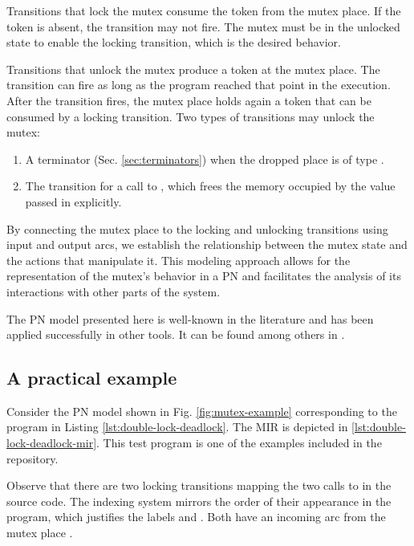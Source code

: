 Transitions that lock the mutex consume the token from the mutex place.
If the token is absent, the transition may not fire.
The mutex must be in the unlocked state to enable the locking transition,
which is the desired behavior.

Transitions that unlock the mutex produce a token at the mutex place.
The transition can fire as long as the program reached that point in the execution.
After the transition fires, the mutex place holds again a token
that can be consumed by a locking transition.
Two types of transitions may unlock the mutex:

\begin{enumerate}
      \item A  terminator (Sec. \ref{sec:terminators})
            when the dropped place is of type .
      \item The transition for a call to ,
            which frees the memory occupied by the value passed in explicitly.
\end{enumerate}

By connecting the mutex place
to the locking and unlocking transitions using input and output arcs,
we establish the relationship between the mutex state and the actions that manipulate it.
This modeling approach allows for the representation of the mutex's behavior in a \acrshort{PN}
and facilitates the analysis of its interactions with other parts of the system.

The \acrshort{PN} model presented here is well-known in the literature
and has been applied successfully in other tools.
It can be found among others in \cite{kavi2002modeling,moshtaghi2001,meyer2020,zhang2022deadlocks}.

\subsection{A practical example}

Consider the \acrshort{PN} model shown in Fig. \ref{fig:mutex-example}
corresponding to the program in Listing \ref{lst:double-lock-deadlock}.
The \acrshort{MIR} is depicted in \ref{lst:double-lock-deadlock-mir}.
This test program is one of the examples included in the repository.

Observe that there are two locking transitions
mapping the two calls to  in the source code.
The indexing system mirrors the order of their appearance in the program,
which justifies the labels 
and .
Both have an incoming arc from the mutex place .

